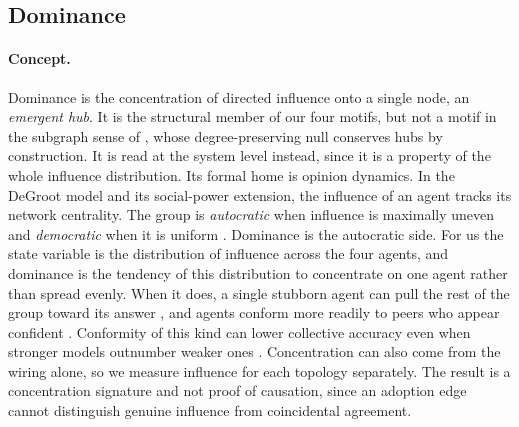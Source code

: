 \subsection{Dominance}
\label{sec:method:dominance}

\paragraph{Concept.}
Dominance is the concentration of directed influence onto a single node, an
\emph{emergent hub}. It is the structural member of our four motifs, but not a
motif in the subgraph sense of \citet{milo2002network}, whose degree-preserving
null conserves hubs by construction. It is read at the system level instead, since
it is a property of the whole influence distribution. Its formal home is opinion dynamics. In the DeGroot model
\citep{degroot1974consensus} and its social-power extension, the influence of an agent
tracks its network centrality. The group is \emph{autocratic} when influence is
maximally uneven and \emph{democratic} when it is uniform \citep{jia2015opinion}.
Dominance is the autocratic side. For us the state variable is the distribution of
influence across the four agents, and dominance is the tendency of this
distribution to concentrate on one agent rather than spread evenly. When it does,
a single stubborn agent can pull the rest of the group toward its answer
\citep{chen2023consensus}, and agents conform more readily to peers who appear
confident \citep{cho2025herd}. Conformity of this kind can lower collective
accuracy even when stronger models outnumber weaker ones \citep{wynn2025talk}. Concentration can
also come from the wiring alone, so we measure influence for each topology
separately. The result is a concentration signature and not proof of causation,
since an adoption edge cannot distinguish genuine influence from coincidental
agreement.

